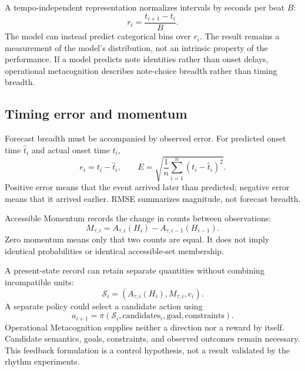 \documentclass[11pt,a4paper]{article}
\begin{document}
A tempo-independent representation normalizes intervals by seconds per beat $B$:
\begin{equation}
r_i=\frac{t_{i+1}-t_i}{B}.
\end{equation}
The model can instead predict categorical bins over $r_i$. The result remains a measurement of the model's distribution, not an intrinsic property of the performance. If a model predicts note identities rather than onset delays, operational metacognition describes note-choice breadth rather than timing breadth.

\subsection{Timing error and momentum}
Forecast breadth must be accompanied by observed error. For predicted onset time $\hat t_i$ and actual onset time $t_i$,
\begin{equation}
e_i=t_i-\hat t_i,\qquad
E=\sqrt{\frac{1}{n}\sum_{i=1}^{n}(t_i-\hat t_i)^2}.
\end{equation}
Positive error means that the event arrived later than predicted; negative error means that it arrived earlier. RMSE summarizes magnitude, not forecast breadth.

Accessible Momentum records the change in counts between observations:
\begin{equation}
M_{\tau,i}=A_{\tau,i}(H_i)-A_{\tau,i-1}(H_{i-1}).
\end{equation}
Zero momentum means only that two counts are equal. It does not imply identical probabilities or identical accessible-set membership.

A present-state record can retain separate quantities without combining incompatible units:
\begin{equation}
\mathcal{S}_i=(A_{\tau,i}(H_i),M_{\tau,i},e_i).
\end{equation}
A separate policy could select a candidate action using
\begin{equation}
a_{i+1}=\pi(\mathcal{S}_i,\text{candidates}_i,\text{goal},\text{constraints}).
\end{equation}
Operational Metacognition supplies neither a direction nor a reward by itself. Candidate semantics, goals, constraints, and observed outcomes remain necessary. This feedback formulation is a control hypothesis, not a result validated by the rhythm experiments.
\end{document}
